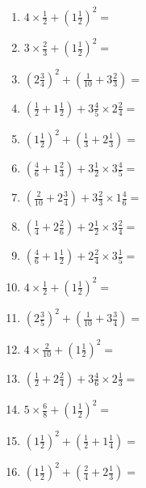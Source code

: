 \documentclass[12pt]{article}
\begin{document}
\begin{enumerate}
\item \large $ 4 \times \frac{1}{2} + (1 \frac{1}{2})^2 = $ \vspace{1.8cm}
\item \large $ 3 \times \frac{2}{3} + (1 \frac{1}{2})^2 = $ \vspace{1.8cm}
\item \large $ (2 \frac{3}{4})^2 + (\frac{1}{10} + 3 \frac{2}{3}) = $ \vspace{1.8cm}
\item \large $ (\frac{1}{2} + 1 \frac{1}{2}) + 3 \frac{4}{5} \times 2 \frac{2}{4} = $ \vspace{1.8cm}
\item \large $ (1 \frac{1}{2})^2 + (\frac{1}{3} + 2 \frac{1}{3}) = $ \vspace{1.8cm}
\newpage
\item \large $ (\frac{4}{6} + 1 \frac{2}{3}) + 3 \frac{1}{2} \times 3 \frac{4}{5} = $ \vspace{1.8cm}
\item \large $ (\frac{2}{10} + 2 \frac{3}{4}) + 3 \frac{2}{3} \times 1 \frac{4}{6} = $ \vspace{1.8cm}
\item \large $ (\frac{1}{4} + 2 \frac{2}{6}) + 2 \frac{1}{2} \times 3 \frac{2}{4} = $ \vspace{1.8cm}
\item \large $ (\frac{4}{6} + 1 \frac{1}{2}) + 2 \frac{2}{4} \times 3 \frac{1}{5} = $ \vspace{1.8cm}
\item \large $ 4 \times \frac{1}{2} + (1 \frac{1}{2})^2 = $ \vspace{1.8cm}
\item \large $ (2 \frac{3}{5})^2 + (\frac{1}{10} + 3 \frac{3}{4}) = $ \vspace{1.8cm}
\item \large $ 4 \times \frac{2}{10} + (1 \frac{1}{2})^2 = $ \vspace{1.8cm}
\item \large $ (\frac{1}{2} + 2 \frac{2}{4}) + 3 \frac{4}{6} \times 2 \frac{1}{3} = $ \vspace{1.8cm}
\item \large $ 5 \times \frac{6}{8} + (1 \frac{1}{2})^2 = $ \vspace{1.8cm}
\item \large $ (1 \frac{1}{2})^2 + (\frac{1}{2} + 1 \frac{1}{4}) = $ \vspace{1.8cm}
\newpage
\item \large $ (1 \frac{1}{2})^2 + (\frac{2}{4} + 2 \frac{1}{3}) = $ \vspace{1.8cm}

\end{enumerate}
\end{document}
